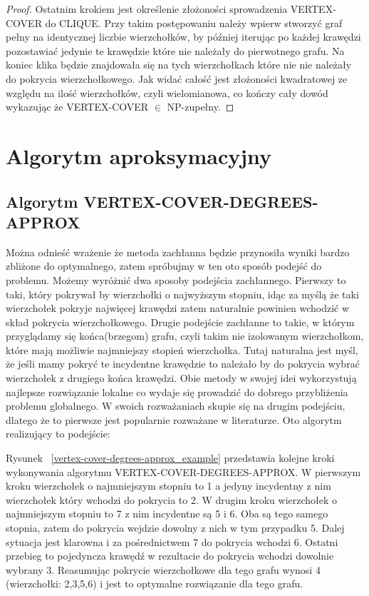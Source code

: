 \begin{proof}
Ostatnim krokiem jest określenie złożoności sprowadzenia VERTEX-COVER do CLIQUE. Przy takim postępowaniu należy wpierw stworzyć graf pełny na identycznej liczbie wierzchołków, by później iterując po każdej krawędzi pozostawiać jedynie te krawędzie które nie należały do pierwotnego grafu. Na koniec klika będzie znajdowała się na tych wierzchołkach które nie nie należały do pokrycia wierzchołkowego. Jak widać całość jest złożoności kwadratowej ze względu na ilość wierzchołków, czyli wielomianowa, co kończy cały dowód wykazując że VERTEX-COVER $\in$ NP-zupełny.
\end{proof}

\section{Algorytm aproksymacyjny}

\subsection{Algorytm VERTEX-COVER-DEGREES-APPROX}

	Można odnieść wrażenie że metoda zachłanna będzie przynosiła wyniki bardzo zbliżone do optymalnego, zatem spróbujmy w ten oto sposób podejść do problemu. Możemy wyróżnić dwa sposoby podejścia zachłannego. Pierwszy to taki, który pokrywał by wierzchołki o najwyższym stopniu, idąc za myślą że taki wierzchołek pokryje najwięcej krawędzi zatem naturalnie powinien wchodzić w skład pokrycia wierzchołkowego. Drugie podejście zachłanne to takie, w którym przyglądamy się końca(brzegom) grafu, czyli takim nie izolowanym wierzchołkom, które mają możliwie najmniejszy stopień wierzchołka. Tutaj naturalna jest myśl, że jeśli mamy pokryć te incydentne krawędzie to należało by do pokrycia wybrać wierzchołek z drugiego końca krawędzi. Obie metody w swojej idei wykorzystują najlepsze rozwiązanie lokalne co wydaje się prowadzić do dobrego przybliżenia problemu globalnego. W swoich rozważaniach skupie się na drugim podejściu, dlatego że to pierwsze jest popularnie rozważane w literaturze.
	Oto algorytm realizujący to podejście:



	Rysunek ~\ref{vertex-cover-degrees-approx_example} przedstawia kolejne kroki wykonywania algorytmu VERTEX-COVER-DEGREES-APPROX. W pierwszym kroku wierzchołek o najmniejszym stopniu to 1 a jedyny incydentny z nim wierzchołek który wchodzi do pokrycia to 2. W drugim kroku wierzchołek o najmniejszym stopniu to 7 z nim incydentne są 5 i 6. Oba są tego samego stopnia, zatem do pokrycia wejdzie dowolny z nich w tym przypadku 5. Dalej sytuacja jest klarowna i za pośrednictwem 7 do pokrycia wchodzi 6. Ostatni przebieg to pojedyncza krawędź w rezultacie do pokrycia wchodzi dowolnie wybrany 3. Reasumując pokrycie wierzchołkowe dla tego grafu wynosi 4 (wierzchołki: 2,3,5,6) i jest to optymalne rozwiązanie dla tego grafu.
	
